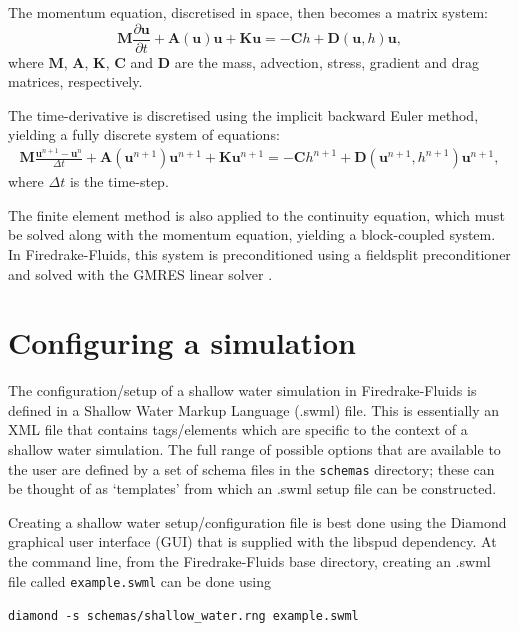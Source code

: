 \documentclass[a4paper,11pt]{report}
\begin{document}
The momentum equation, discretised in space, then becomes a matrix system:
\begin{equation}
   \mathbf{M}\frac{\partial\mathbf{u}}{\partial t} + \mathbf{A}(\mathbf{u})\mathbf{u} + \mathbf{K}\mathbf{u} = -\mathbf{C}h + \mathbf{D}(\mathbf{u}, h)\mathbf{u},
\end{equation}
where $\mathbf{M}$, $\mathbf{A}$, $\mathbf{K}$, $\mathbf{C}$ and $\mathbf{D}$ are the mass, advection, stress, gradient and drag matrices, respectively.

The time-derivative is discretised using the implicit backward Euler method, yielding a fully discrete system of equations:
\begin{eqnarray}
   \mathbf{M}\frac{\mathbf{u}^{n+1} - \mathbf{u}^{n}}{\Delta t} + \mathbf{A}(\mathbf{u}^{n+1})\mathbf{u}^{n+1} + \mathbf{K}\mathbf{u}^{n+1} = -\mathbf{C}h^{n+1} + \mathbf{D}(\mathbf{u}^{n+1}, h^{n+1})\mathbf{u}^{n+1},
\end{eqnarray}
where $\Delta t$ is the time-step.

The finite element method is also applied to the continuity equation, which must be solved along with the momentum equation, yielding a block-coupled system. In Firedrake-Fluids, this system is preconditioned using a fieldsplit preconditioner \citep{Brown_etal_2012} and solved with the GMRES linear solver \citep{SaadSchultz_1986}.

\section{Configuring a simulation}
The configuration/setup of a shallow water simulation in Firedrake-Fluids is defined in a Shallow Water Markup Language (.swml) file. This is essentially an XML file that contains tags/elements which are specific to the context of a shallow water simulation. The full range of possible options that are available to the user are defined by a set of schema files in the \texttt{schemas} directory; these can be thought of as `templates' from which an .swml setup file can be constructed.

Creating a shallow water setup/configuration file is best done using the Diamond graphical user interface (GUI) \citep{Ham_etal_2009} that is supplied with the libspud dependency. At the command line, from the Firedrake-Fluids base directory, creating an .swml file called \texttt{example.swml} can be done using

\texttt{diamond -s schemas/shallow\_water.rng example.swml}
\end{document}
